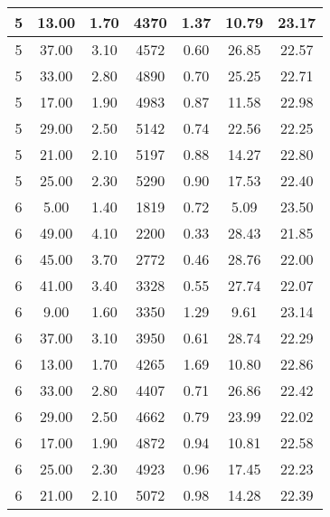 \begin{tabular}{|c|c|c|c|c|c|c|}
\hline
5 & 13.00 & 1.70 & 4370 & 1.37 & 10.79 & 23.17\\
\hline
5 & 37.00 & 3.10 & 4572 & 0.60 & 26.85 & 22.57\\
\hline
5 & 33.00 & 2.80 & 4890 & 0.70 & 25.25 & 22.71\\
\hline
5 & 17.00 & 1.90 & 4983 & 0.87 & 11.58 & 22.98\\
\hline
5 & 29.00 & 2.50 & 5142 & 0.74 & 22.56 & 22.25\\
\hline
5 & 21.00 & 2.10 & 5197 & 0.88 & 14.27 & 22.80\\
\hline
5 & 25.00 & 2.30 & 5290 & 0.90 & 17.53 & 22.40\\
\hline
6 & 5.00 & 1.40 & 1819 & 0.72 & 5.09 & 23.50\\
\hline
6 & 49.00 & 4.10 & 2200 & 0.33 & 28.43 & 21.85\\
\hline
6 & 45.00 & 3.70 & 2772 & 0.46 & 28.76 & 22.00\\
\hline
6 & 41.00 & 3.40 & 3328 & 0.55 & 27.74 & 22.07\\
\hline
6 & 9.00 & 1.60 & 3350 & 1.29 & 9.61 & 23.14\\
\hline
6 & 37.00 & 3.10 & 3950 & 0.61 & 28.74 & 22.29\\
\hline
6 & 13.00 & 1.70 & 4265 & 1.69 & 10.80 & 22.86\\
\hline
6 & 33.00 & 2.80 & 4407 & 0.71 & 26.86 & 22.42\\
\hline
6 & 29.00 & 2.50 & 4662 & 0.79 & 23.99 & 22.02\\
\hline
6 & 17.00 & 1.90 & 4872 & 0.94 & 10.81 & 22.58\\
\hline
6 & 25.00 & 2.30 & 4923 & 0.96 & 17.45 & 22.23\\
\hline
6 & 21.00 & 2.10 & 5072 & 0.98 & 14.28 & 22.39\\
\hline
\end{tabular}
